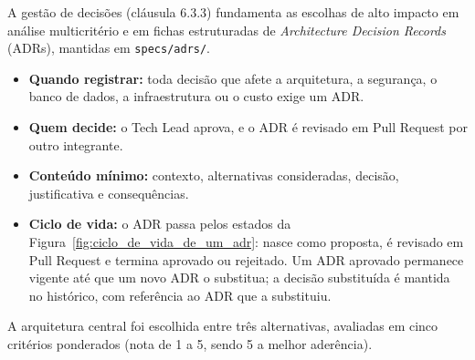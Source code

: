 


A gestão de decisões (cláusula 6.3.3) fundamenta as escolhas de alto impacto em análise multicritério e em fichas estruturadas de \emph{Architecture Decision Records} (ADRs), mantidas em \texttt{specs/\allowbreak\hspace{0pt plus 1pt}adrs/}.


\begin{itemize}
\item \textbf{Quando registrar:} toda decisão que afete a arquitetura, a segurança, o banco de dados, a infraestrutura ou o custo exige um ADR.
\item \textbf{Quem decide:} o Tech Lead aprova, e o ADR é revisado em Pull Request por outro integrante.
\item \textbf{Conteúdo mínimo:} contexto, alternativas consideradas, decisão, justificativa e consequências.
\item \textbf{Ciclo de vida:} o ADR passa pelos estados da Figura~\ref{fig:ciclo_de_vida_de_um_adr}: nasce como proposta, é revisado em Pull Request e termina aprovado ou rejeitado. Um ADR aprovado permanece vigente até que um novo ADR o substitua; a decisão substituída é mantida no histórico, com referência ao ADR que a substituiu.
\end{itemize}



A arquitetura central foi escolhida entre três alternativas, avaliadas em cinco critérios ponderados (nota de 1 a 5, sendo 5 a melhor aderência).

